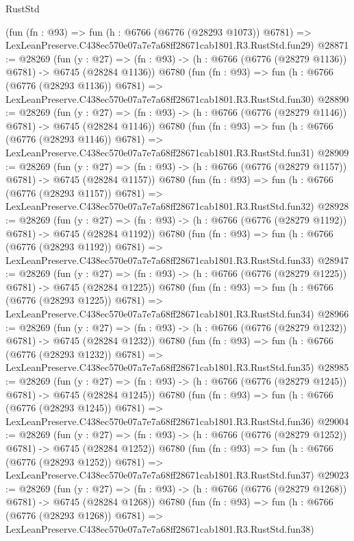 \begin{lexlean}{RustStd}
\begin{coremodule}
    (fun (fn : @93) =>
    fun (h : @6766 (@6776 (@28293 @1073)) @6781) =>
    LexLeanPreserve.C438ec570e07a7e7a68ff28671cab1801.R3.RustStd.fun29)
@28871 := @28269
    (fun (y : @27) =>
    (fn : @93) -> (h : @6766 (@6776 (@28279 @1136)) @6781) -> @6745 (@28284 @1136))
    @6780
    (fun (fn : @93) =>
    fun (h : @6766 (@6776 (@28293 @1136)) @6781) =>
    LexLeanPreserve.C438ec570e07a7e7a68ff28671cab1801.R3.RustStd.fun30)
@28890 := @28269
    (fun (y : @27) =>
    (fn : @93) -> (h : @6766 (@6776 (@28279 @1146)) @6781) -> @6745 (@28284 @1146))
    @6780
    (fun (fn : @93) =>
    fun (h : @6766 (@6776 (@28293 @1146)) @6781) =>
    LexLeanPreserve.C438ec570e07a7e7a68ff28671cab1801.R3.RustStd.fun31)
@28909 := @28269
    (fun (y : @27) =>
    (fn : @93) -> (h : @6766 (@6776 (@28279 @1157)) @6781) -> @6745 (@28284 @1157))
    @6780
    (fun (fn : @93) =>
    fun (h : @6766 (@6776 (@28293 @1157)) @6781) =>
    LexLeanPreserve.C438ec570e07a7e7a68ff28671cab1801.R3.RustStd.fun32)
@28928 := @28269
    (fun (y : @27) =>
    (fn : @93) -> (h : @6766 (@6776 (@28279 @1192)) @6781) -> @6745 (@28284 @1192))
    @6780
    (fun (fn : @93) =>
    fun (h : @6766 (@6776 (@28293 @1192)) @6781) =>
    LexLeanPreserve.C438ec570e07a7e7a68ff28671cab1801.R3.RustStd.fun33)
@28947 := @28269
    (fun (y : @27) =>
    (fn : @93) -> (h : @6766 (@6776 (@28279 @1225)) @6781) -> @6745 (@28284 @1225))
    @6780
    (fun (fn : @93) =>
    fun (h : @6766 (@6776 (@28293 @1225)) @6781) =>
    LexLeanPreserve.C438ec570e07a7e7a68ff28671cab1801.R3.RustStd.fun34)
@28966 := @28269
    (fun (y : @27) =>
    (fn : @93) -> (h : @6766 (@6776 (@28279 @1232)) @6781) -> @6745 (@28284 @1232))
    @6780
    (fun (fn : @93) =>
    fun (h : @6766 (@6776 (@28293 @1232)) @6781) =>
    LexLeanPreserve.C438ec570e07a7e7a68ff28671cab1801.R3.RustStd.fun35)
@28985 := @28269
    (fun (y : @27) =>
    (fn : @93) -> (h : @6766 (@6776 (@28279 @1245)) @6781) -> @6745 (@28284 @1245))
    @6780
    (fun (fn : @93) =>
    fun (h : @6766 (@6776 (@28293 @1245)) @6781) =>
    LexLeanPreserve.C438ec570e07a7e7a68ff28671cab1801.R3.RustStd.fun36)
@29004 := @28269
    (fun (y : @27) =>
    (fn : @93) -> (h : @6766 (@6776 (@28279 @1252)) @6781) -> @6745 (@28284 @1252))
    @6780
    (fun (fn : @93) =>
    fun (h : @6766 (@6776 (@28293 @1252)) @6781) =>
    LexLeanPreserve.C438ec570e07a7e7a68ff28671cab1801.R3.RustStd.fun37)
@29023 := @28269
    (fun (y : @27) =>
    (fn : @93) -> (h : @6766 (@6776 (@28279 @1268)) @6781) -> @6745 (@28284 @1268))
    @6780
    (fun (fn : @93) =>
    fun (h : @6766 (@6776 (@28293 @1268)) @6781) =>
    LexLeanPreserve.C438ec570e07a7e7a68ff28671cab1801.R3.RustStd.fun38)

\end{coremodule}
\end{lexlean}
